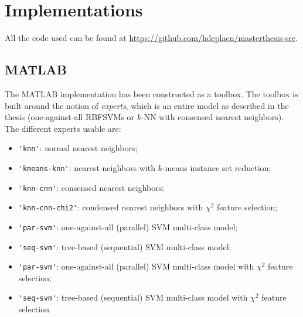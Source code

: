 \chapter{Implementations}
\label{app:impl}
All the code used can be found at \url{https://github.com/hdeplaen/masterthesis-src}.

\section{MATLAB}
The MATLAB implementation has been constructed as a toolbox. The toolbox is built around the notion of \emph{experts}, which is an entire model as described in the thesis (one-against-all RBFSVMs or $k$-NN with consensed nearest neighbors). The different experts usable are:
\begin{itemize}
    \item \verb='knn'=: normal nearest neighbors;
    \item \verb='kmeans-knn'=: nearest neighbors with $k$-means instance set reduction;
    \item \verb='knn-cnn'=: consensed nearest neighbors;
    \item \verb='knn-cnn-chi2'=: condensed nearest neighbors with $\chi^2$ feature selection;
    \item \verb='par-svm'=: one-against-all (parallel) SVM multi-class model;
    \item \verb='seq-svm'=: tree-based (sequential) SVM multi-class model;
    \item \verb='par-svm'=: one-against-all (parallel) SVM multi-class model with $\chi^2$ feature selection;
    \item \verb='seq-svm'=: tree-based (sequential) SVM multi-class model with $\chi^2$ feature selection.
\end{itemize}

